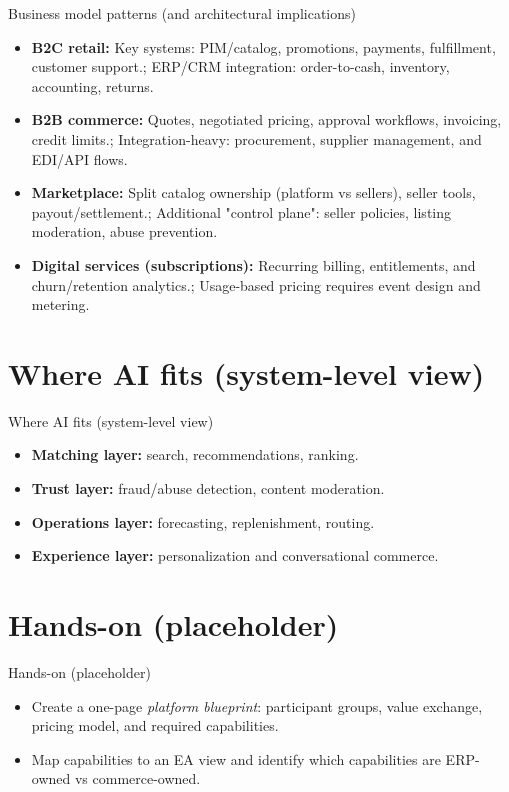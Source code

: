 \documentclass[aspectratio=169]{beamer}
\begin{document}
\begin{frame}{Business model patterns (and architectural implications)}
  \begin{itemize}
    \item \textbf{B2C retail:} Key systems: PIM/catalog, promotions, payments, fulfillment, customer support.; ERP/CRM integration: order-to-cash, inventory, accounting, returns.
    \item \textbf{B2B commerce:} Quotes, negotiated pricing, approval workflows, invoicing, credit limits.; Integration-heavy: procurement, supplier management, and EDI/API flows.
    \item \textbf{Marketplace:} Split catalog ownership (platform vs sellers), seller tools, payout/settlement.; Additional "control plane": seller policies, listing moderation, abuse prevention.
    \item \textbf{Digital services (subscriptions):} Recurring billing, entitlements, and churn/retention analytics.; Usage-based pricing requires event design and metering.
  \end{itemize}
\end{frame}

\section{Where AI fits (system-level view)}

\begin{frame}{Where AI fits (system-level view)}
  \begin{itemize}
    \item \textbf{Matching layer:} search, recommendations, ranking.
    \item \textbf{Trust layer:} fraud/abuse detection, content moderation.
    \item \textbf{Operations layer:} forecasting, replenishment, routing.
    \item \textbf{Experience layer:} personalization and conversational commerce.
  \end{itemize}
\end{frame}

\section{Hands-on (placeholder)}

\begin{frame}{Hands-on (placeholder)}
  \begin{itemize}
    \item Create a one-page \emph{platform blueprint}: participant groups, value exchange, pricing model, and required capabilities.
    \item Map capabilities to an EA view and identify which capabilities are ERP-owned vs commerce-owned.
  \end{itemize}
\end{frame}
\end{document}

